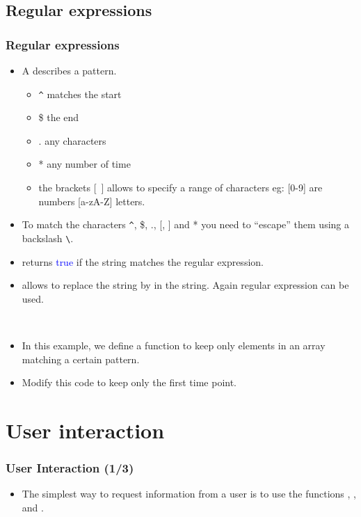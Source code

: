 \subsection{Regular expressions}
\begin{frame}[fragile]
  \frametitle<presentation>{Regular expressions}
  \begin{itemize}
  \item  A  describes a pattern.
    \begin{itemize}
    \item \verb?^? matches the start
    \item \$ the end
    \item . any characters
    \item * any number of time
    \item the brackets [~] allows to specify a range of characters eg:
      [0-9] are numbers [a-zA-Z] letters.
    \end{itemize}
  \item To match the characters \verb?^?, \$, ., [, ] and * you need to
    ``escape'' them using a backslash \verb?\?.
  \item {} returns \textcolor{blue}{true}
    if the string matches the regular expression.
  \item {} allows to replace the string
     by  in the string. Again regular expression
    can be used.
  \end{itemize}
\end{frame}

\begin{frame}
  \begin{example}~\par
    \begin{itemize}
    \item In this example, we define a function to keep only elements
      in an array matching a certain pattern.\par
      
    \item Modify this code to keep only the first time point.
    \end{itemize}
  \end{example}
\end{frame}

\section{User interaction}
\begin{frame}[fragile]
  \frametitle<presentation>{User Interaction (1/3)}
  \begin{itemize}
  \item The simplest way to request information from a user is to use
    the functions , ,
     and .\par
    
  \end{itemize}
\end{frame}

